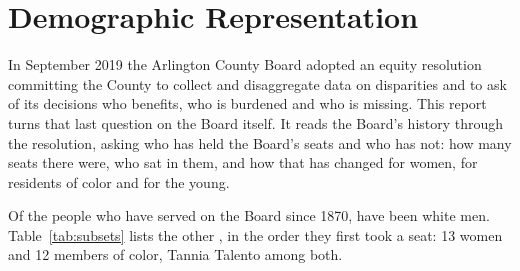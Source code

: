 \section{Demographic Representation}\label{sec:who}

In September 2019 the Arlington County Board adopted an equity resolution
committing the County to collect and disaggregate data on disparities and to ask
of its decisions who benefits, who is burdened and who is
missing.\autocite{arlingtoncb2019equity} This report turns that last question on
the Board itself. It reads the Board's history through the resolution, asking who
has held the Board's seats and who has not: how many seats there were, who sat in
them, and how that has changed for women, for residents of color and for the
young.

Of the \membersTotal{} people who have served on the Board since 1870,
\whiteMenMembers{} have been white men. Table~\ref{tab:subsets} lists the
other \notWhiteMenMembers{}, in the order they first took a seat: 13 women
and 12 members of color, Tannia Talento among both.



\clearpage
